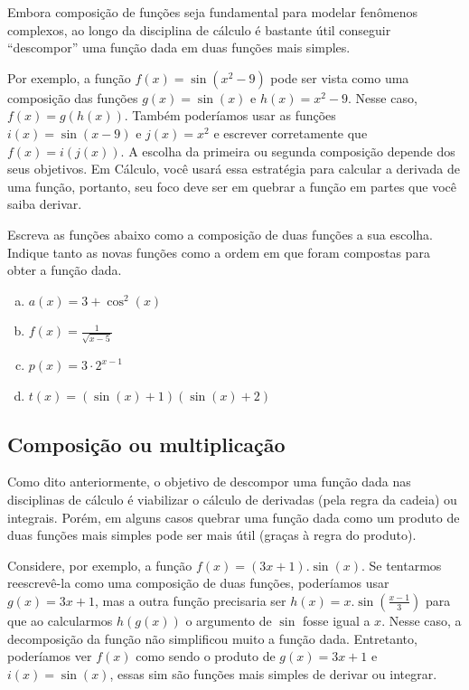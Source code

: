 \documentclass[main_estudante.tex]{subfiles}
\begin{document}
Embora composição de funções seja fundamental para modelar fenômenos complexos, ao longo da disciplina de cálculo é bastante útil conseguir ``descompor'' uma função dada em duas funções mais simples.

Por exemplo, a função $f(x)=\sin(x^2-9)$ pode ser vista como uma composição das funções $g(x)=\sin(x)$ e $h(x)=x^2-9$. Nesse caso, $f(x)=g(h(x))$. Também poderíamos usar as funções $i(x)=\sin(x-9)$ e $j(x)=x^2$ e escrever corretamente que $f(x)=i(j(x))$. A escolha da primeira ou segunda composição depende dos seus objetivos. Em Cálculo, você usará essa estratégia para calcular a derivada de uma função, portanto, seu foco deve ser em quebrar a função em partes que você saiba derivar.

\begin{questao}
Escreva as funções abaixo como a composição de duas funções a sua escolha. Indique tanto as novas funções como a ordem em que foram compostas para obter a função dada.
\begin{enumerate}[a)]
\item $a(x)=3+\cos^2(x)$
\item $f(x)=\frac{1}{\sqrt{x-5}}$
\item $p(x)=3 \cdot 2^{x-1}$
\item $t(x)=(\sin(x)+1)(\sin(x)+2)$
\end{enumerate}
\end{questao}

\subsection*{Composição ou multiplicação}

Como dito anteriormente, o objetivo de descompor uma função dada nas disciplinas de cálculo é viabilizar o cálculo de derivadas (pela regra da cadeia) ou integrais. Porém, em alguns casos quebrar uma função dada como um produto de duas funções mais simples pode ser mais útil (graças à regra do produto).

Considere, por exemplo, a função $f(x)=(3x+1).\sin(x)$. Se tentarmos reescrevê-la como uma composição de duas funções, poderíamos usar $g(x)=3x+1$, mas a outra função precisaria ser $h(x)=x.\sin(\frac{x-1}{3})$ para que ao calcularmos $h(g(x))$ o argumento de $\sin$ fosse igual a $x$. Nesse caso, a decomposição da função não simplificou muito a função dada. Entretanto, poderíamos ver $f(x)$ como sendo o produto de $g(x)=3x+1$ e $i(x)=\sin(x)$, essas sim são funções mais simples de derivar ou integrar.
\end{document}
